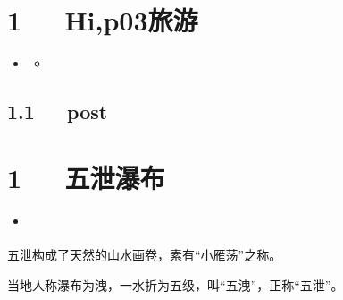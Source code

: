 \documentclass[letterpaper,12pt,english]{sphinxmanual}
\begin{document}
\chapter{1   Hi,p03旅游}
\label{\detokenize{p03_u65c5_u6e38/Hello_uff0cp03_u65c5_u6e38:hi-p03}}\label{\detokenize{p03_u65c5_u6e38/Hello_uff0cp03_u65c5_u6e38::doc}}
\begin{sphinxShadowBox}
\begin{itemize}
\item {} 
\label{\detokenize{p03_u65c5_u6e38/Hello_uff0cp03_u65c5_u6e38:id2}}{\hyperref[\detokenize{p03_u65c5_u6e38/Hello_uff0cp03_u65c5_u6e38:hi-p03}]{}}
\begin{itemize}
\item {} 
\label{\detokenize{p03_u65c5_u6e38/Hello_uff0cp03_u65c5_u6e38:id3}}{\hyperref[\detokenize{p03_u65c5_u6e38/Hello_uff0cp03_u65c5_u6e38:post}]{}}

\end{itemize}

\end{itemize}
\end{sphinxShadowBox}


\section{1.1   post}
\label{\detokenize{p03_u65c5_u6e38/Hello_uff0cp03_u65c5_u6e38:post}}

\chapter{1   五泄瀑布}
\label{\detokenize{p03_u65c5_u6e38/_u4e94_u6cc4_u7011_u5e03:id1}}\label{\detokenize{p03_u65c5_u6e38/_u4e94_u6cc4_u7011_u5e03::doc}}
\begin{sphinxShadowBox}
\begin{itemize}
\item {} 
\label{\detokenize{p03_u65c5_u6e38/_u4e94_u6cc4_u7011_u5e03:id3}}{\hyperref[\detokenize{p03_u65c5_u6e38/_u4e94_u6cc4_u7011_u5e03:id1}]{}}

\end{itemize}
\end{sphinxShadowBox}

五泄构成了天然的山水画卷，素有“小雁荡”之称。

当地人称瀑布为洩，一水折为五级，叫“五洩”，正称“五泄”。
\end{document}
